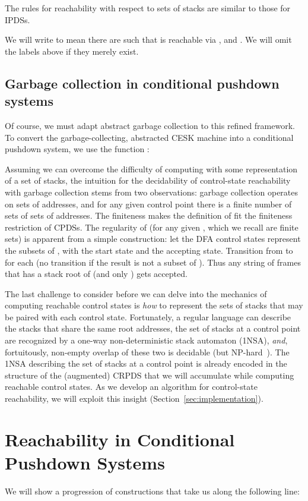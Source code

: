 The rules for reachability with respect to sets of stacks are similar to those for IPDSs.


We will write  to mean there are  such that  is reachable via ,  and . We will omit the labels above if they merely exist.

\subsection{Garbage collection in conditional pushdown systems}

Of course, we must adapt abstract garbage collection to this refined framework.
To convert the garbage-collecting,
abstracted CESK machine into a conditional pushdown system,
we use the function :


Assuming we can overcome the difficulty of computing with some representation of a set of stacks, the intuition for the decidability of control-state reachability with garbage collection stems from two observations:
garbage collection operates on sets of addresses, and for any given control point there is a finite number of sets of sets of addresses.
The finiteness makes the definition of  fit the finiteness restriction of CPDSs.
The regularity of  (for any given , which we recall are finite sets) is apparent from a simple construction: let the DFA control states represent the subsets of , with  the start state and  the accepting state.
Transition from  to  for each  (no transition if the result is not a subset of ).
Thus any string of frames that has a stack root of  (and only ) gets accepted.

The last challenge to consider before we 
can delve into the mechanics of computing reachable control states
is \emph{how} to represent the sets of stacks 
that may be paired with each control state.
Fortunately, a regular language can describe the stacks that share the same root addresses,
the set of stacks at a control point are recognized by a one-way non-deterministic stack automaton (1NSA), \emph{and}, fortuitously,
non-empty overlap of these two is decidable (but NP-hard~\citep{ianjohnson:rounds:complexity:1973}).
The 1NSA describing the set of stacks at a control point is already encoded in the structure of the (augmented) CRPDS that we will accumulate while computing reachable control states.
As we develop an algorithm for control-state reachability, we will
exploit this insight (Section~\ref{sec:implementation}).


\section{Reachability in Conditional Pushdown Systems}
We will show a progression of constructions that take us along the following line:



